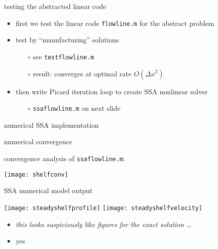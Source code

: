 \begin{frame}{testing the abstracted linear code}

\begin{itemize}
\item first we test the linear code \texttt{flowline.m} for the abstract problem
\item test by ``manufacturing'' solutions
  \begin{itemize}
  \item[$\circ$] see \texttt{testflowline.m}
  \item[$\circ$] result: converges at optimal rate $O(\Delta x^2)$
  \end{itemize}

\bigskip
\item then write Picard iteration loop to create SSA nonlinear solver
  \begin{itemize}
  \item[$\circ$] \texttt{ssaflowline.m} on next slide
  \end{itemize}
\end{itemize}
\end{frame}


\begin{frame}{numerical SSA implementation}

\end{frame}


\begin{frame}{numerical convergence}

convergence analysis of \texttt{ssaflowline.m}:

\begin{center}
  \texttt{[image: shelfconv]}
\end{center}
\end{frame}


\begin{frame}{SSA numerical model output}

\begin{center}
  \texttt{[image: steadyshelfprofile]} \quad
  \texttt{[image: steadyshelfvelocity]}
\end{center}

\bigskip

\begin{itemize}
\item \emph{this looks suspiciously like figures for the exact solution \dots}
\item yes
\end{itemize}
\end{frame}


